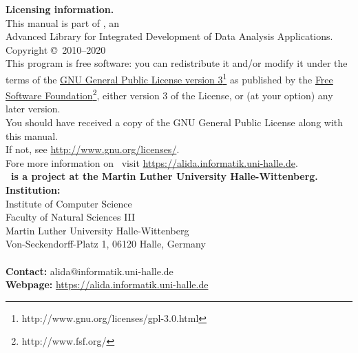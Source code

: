 \newpage
\thispagestyle{empty}
\parindent0pt
{\large \textbf{Licensing information.}}\\[0.5cm]
This manual is part of \alida, an\\
Advanced Library for Integrated Development of Data Analysis
Applications.\\[0.5cm] Copyright \copyright\ 2010--2020\\[0.5cm] 
This program is free software: you can redistribute it and/or modify
it under the terms of the
\href{http://www.gnu.org/licenses/gpl-3.0.html}
{GNU General Public License version	3}\footnote{http://www.gnu.org/licenses/gpl-3.0.html} as published by the \href{http://www.fsf.org/}{Free Software Foundation}\footnote{http://www.fsf.org/}, either version 3 of the License, or (at your option) any later version.\\
You should have received a copy of the GNU General Public License
along with this manual.\\
If not,
see \url{http://www.gnu.org/licenses/}.\\[1.0cm]
Fore more information on \alida\ visit
\href{https://alida.informatik.uni-halle.de}{
https://alida.informatik.uni-halle.de}.\\[5.0cm] 

{\large \textbf{\alida\ is a project at the Martin Luther University
Halle-Wittenberg.}}\\[0.5cm]

\textbf{Institution:}\\[0.5cm]
Institute of Computer Science\\
Faculty of Natural Sciences III\\
Martin Luther University Halle-Wittenberg\\
Von-Seckendorff-Platz 1, 06120 Halle, Germany\\\\
\textbf{Contact:} alida@informatik.uni-halle.de\\
\textbf{Webpage:} \url{https://alida.informatik.uni-halle.de}
\parindent20pt
\newpage
{}


\tableofcontents

\setcounter{page}{1}
\clearpage
{}

